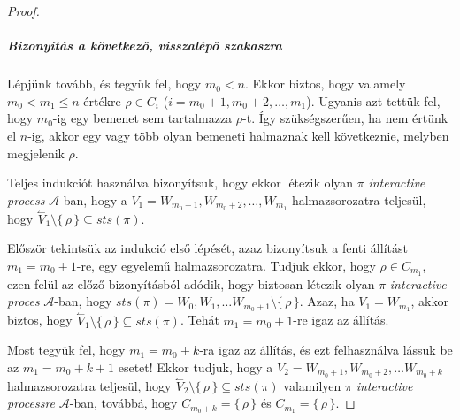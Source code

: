 \documentclass[12pt]{article}
\theoremstyle{definition}
\theoremstyle{remark}
\theoremstyle{plain}
\theoremstyle{remark}
\theoremstyle{plain}
\newcommand{\backwardhat}{\overset{\leftharpoonup}}
\begin{document}
\begin{proof}
        \subparagraph{Bizonyítás a következő, visszalépő szakaszra}
        Lépjünk tovább, és tegyük fel, hogy $m_{0} < n$. Ekkor biztos, hogy valamely $m_{0} < m_{1} \leq n$ értékre $\rho \in C_{i}$ ($i = m_{0} + 1, m_{0} + 2, \ldots, m_{1}$). Ugyanis azt tettük fel, hogy $m_{0}$-ig egy bemenet sem tartalmazza $\rho$-t. Így szükségszerűen, ha nem értünk el $n$-ig, akkor egy vagy több olyan bemeneti halmaznak kell következnie, melyben megjelenik $\rho$.
        
        Teljes indukciót használva bizonyítsuk, hogy ekkor létezik olyan $\pi$ \textit{interactive process} $\mathscr{A}$-ban, hogy a $V_{1} = W_{m_{0} + 1}, W_{m_{0} + 2}, \ldots, W_{m_{1}}$ halmazsorozatra teljesül, hogy $\backwardhat V_{1} \setminus \{\, \rho \,\} \subseteq \textit{sts}(\pi)$.

        Először tekintsük az indukció első lépését, azaz bizonyítsuk a fenti állítást $m_{1} = m_{0} + 1$-re, egy egyelemű halmazsorozatra. Tudjuk ekkor, hogy $\rho \in C_{m_{1}}$, ezen felül az előző bizonyításból adódik, hogy biztosan létezik olyan $\pi$ \textit{interactive proces} $\mathscr{A}$-ban, hogy $\textit{sts}(\pi) = W_{0}, W_{1}, \ldots W_{m_{0} + 1} \setminus \{\,\rho\,\}$. Azaz, ha $V_{1} = W_{m_{1}}$, akkor biztos, hogy $\backwardhat V_{1} \setminus \{\,\rho\,\} \subseteq \textit{sts}(\pi)$. Tehát $m_{1} = m_{0} + 1$-re igaz az állítás.
        
        Most tegyük fel, hogy $m_{1} = m_{0} + k$-ra igaz az állítás, és ezt felhasználva lássuk be az $m_{1} = m_{0} + k + 1$ esetet! Ekkor tudjuk, hogy a $V_{2} = W_{m_{0} + 1}, W_{m_{0} + 2}, \ldots W_{m_{0} + k}$ halmazsorozatra teljesül, hogy $\backwardhat V_{2} \setminus \{ \, \rho \, \} \subseteq \textit{sts}(\pi)$ valamilyen $\pi$ \textit{interactive processre} $\mathscr{A}$-ban, továbbá, hogy $C_{m_{0} + k} = \{ \, \rho \, \}$ és $C_{m_{1}} = \{ \, \rho \,\}$.
        

\end{proof}
\end{document}
